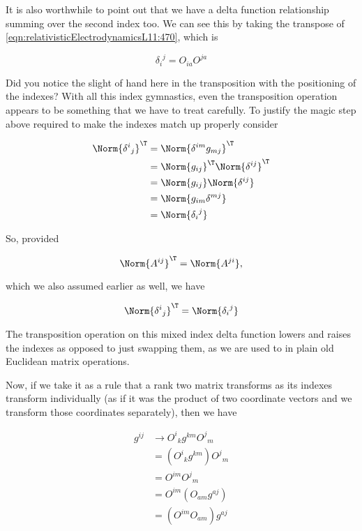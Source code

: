 It is also worthwhile to point out that we have a delta function relationship summing over the second index too.  We can see this by taking the transpose of \ref{eqn:relativisticElectrodynamicsL11:470}, which is

\begin{equation}\label{eqn:relativisticElectrodynamicsL11:480}
{\delta_i}^j 
=
O_{i a} 
O^{j a}
\end{equation}

Did you notice the slight of hand here in the transposition with the positioning of the indexes?  With all this index gymnastics, even the transposition operation appears to be something that we have to treat carefully.  To justify the magic step above required to make the indexes match up properly consider

\begin{align*}
\Norm{{\delta^i}_j}^\T
&=
\Norm{ \delta^{im} g_{mj} }^\T \\
&=
\Norm{ g_{ij} }^\T
\Norm{ \delta^{ij} }^\T 
 \\
&=
\Norm{ g_{ij} }
\Norm{ \delta^{ij} }
 \\
&=
\Norm{ g_{im} \delta^{mj} }
 \\
&=
\Norm{ {\delta_{i}}^j }
\end{align*}

So, provided 

\begin{equation}\label{eqn:relativisticElectrodynamicsL11:n}
\Norm{A^{ij}}^\T = \Norm{A^{ji}},
\end{equation}

which we also assumed earlier as well, we have

\begin{equation}\label{eqn:relativisticElectrodynamicsL11:n}
\Norm{{\delta^i}_j}^\T =
\Norm{ {\delta_{i}}^j }
\end{equation}

The transposition operation on this mixed index delta function lowers and raises the indexes as opposed to just swapping them, as we are used to in plain old Euclidean  matrix operations.

Now, if we take it as a rule that a rank two matrix transforms as its indexes transform individually (as if it was the product of two coordinate vectors and we transform those coordinates separately), then we have

\begin{align*}
g^{ij} 
&\rightarrow {O^i}_k g^{km} {O^j}_m \\
&= ({O^i}_k g^{km}) {O^j}_m \\
&= O^{i m} {O^j}_m \\
&= O^{i m} (O_{a m} g^{a j}) \\
&= (O^{i m} O_{a m}) g^{a j}
\end{align*}

